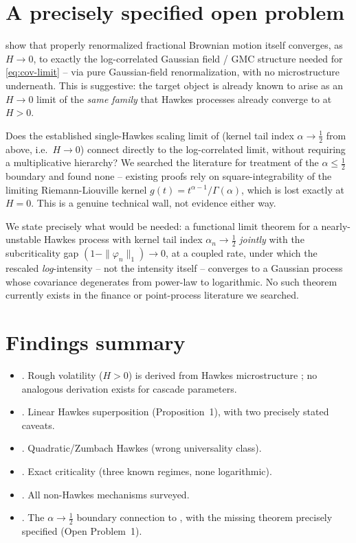 \documentclass[11pt]{article}
\begin{document}
\section{A precisely specified open problem}

\citet{hagerneuman2020multiplicative} show that properly renormalized fractional Brownian motion itself converges, as $H\to0$, to exactly the log-correlated Gaussian field / GMC structure needed for \eqref{eq:cov-limit} -- via pure Gaussian-field renormalization, with no microstructure underneath. This is suggestive: the target object is already known to arise as an $H\to0$ limit of the \emph{same family} that Hawkes processes already converge to at $H>0$.

\begin{openproblem}
Does the established single-Hawkes scaling limit of \citet{jaisson2016rough} (kernel tail index $\alpha\to\tfrac12$ from above, i.e.\ $H\to0$) connect directly to the \citet{hagerneuman2020multiplicative} log-correlated limit, without requiring a multiplicative hierarchy? We searched the literature for treatment of the $\alpha\le\tfrac12$ boundary and found none -- existing proofs rely on square-integrability of the limiting Riemann-Liouville kernel $g(t)=t^{\alpha-1}/\Gamma(\alpha)$, which is lost exactly at $H=0$. This is a genuine technical wall, not evidence either way.
\end{openproblem}

We state precisely what would be needed: a functional limit theorem for a nearly-unstable Hawkes process with kernel tail index $\alpha_n\to\tfrac12$ \emph{jointly} with the subcriticality gap $(1-\|\varphi_n\|_1)\to0$, at a coupled rate, under which the rescaled \emph{log}-intensity -- not the intensity itself -- converges to a Gaussian process whose covariance degenerates from power-law to logarithmic. No such theorem currently exists in the finance or point-process literature we searched.

\section{Findings summary}

\begin{itemize}
\item {}. Rough volatility ($H>0$) is derived from Hawkes microstructure \citep{eleuch2018microstructural,jaisson2016rough}; no analogous derivation exists for cascade parameters.
\item {}. Linear Hawkes superposition (Proposition~1), with two precisely stated caveats.
\item {}. Quadratic/Zumbach Hawkes (wrong universality class).
\item {}. Exact criticality (three known regimes, none logarithmic).
\item {}. All non-Hawkes mechanisms surveyed.
\item {}. The $\alpha\to\tfrac12$ boundary connection to \citet{hagerneuman2020multiplicative}, with the missing theorem precisely specified (Open Problem~1).
\end{itemize}
\end{document}
